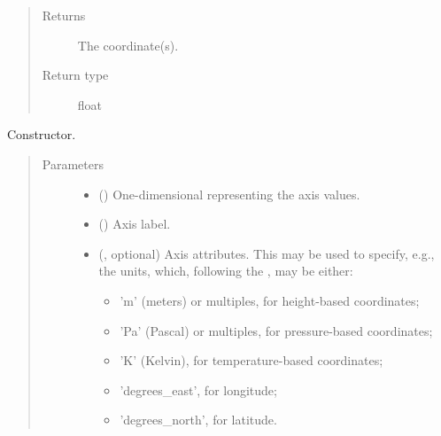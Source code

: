 \documentclass[letterpaper,10pt,english]{sphinxmanual}
\begin{document}
\begin{fulllineitems}
\begin{fulllineitems}
\begin{quote}
\begin{description}
\item[{Returns}] \leavevmode
The coordinate(s).

\item[{Return type}] \leavevmode
float

\end{description}\end{quote}

\end{fulllineitems}


\begin{fulllineitems}
\label{\detokenize{api:tasmania.grids.axis.Axis.__init__}}
Constructor.
\begin{quote}\begin{description}
\item[{Parameters}] \leavevmode\begin{itemize}
\item {} 
 () \textendash{} One-dimensional  representing the axis values.

\item {} 
 () \textendash{} Axis label.

\item {} 
 (, optional) \textendash{} 
Axis attributes. This may be used to specify, e.g., the units, which, following the
, may be either:
\begin{itemize}
\item {} 
’m’ (meters) or multiples, for height-based coordinates;

\item {} 
’Pa’ (Pascal) or multiples, for pressure-based coordinates;

\item {} 
’K’ (Kelvin), for temperature-based coordinates;

\item {} 
’degrees\_east’, for longitude;

\item {} 
’degrees\_north’, for latitude.


\end{itemize}
\end{itemize}
\end{description}
\end{quote}
\end{fulllineitems}
\end{fulllineitems}
\end{document}
